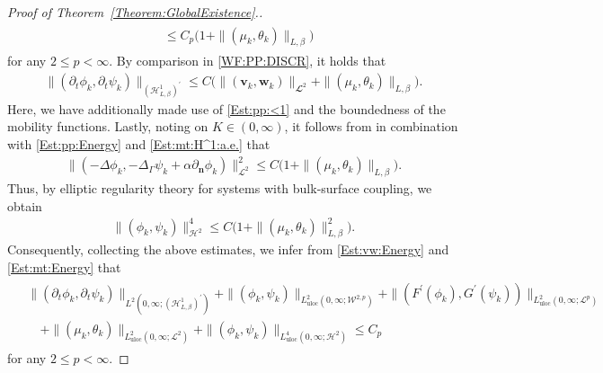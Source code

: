 \documentclass[10pt,reqno]{amsart}
\theoremstyle{remark}
\numberwithin{equation}{section}
\newcommand{\norm}[1]{\| #1 \|}
\newcommand{\n}{\mathbf{n}}
\newcommand{\bv}{\mathbf{v}}
\newcommand{\bw}{\mathbf{w}}
\newcommand{\delt}{\partial_{t}}
\newcommand{\deln}{\partial_\n}
\newcommand{\Lap}{\Delta}
\newcommand{\Lapg}{\Delta_\Ga}
\newcommand{\Ga}{\Gamma}
\begin{document}
\begin{proof}[Proof of Theorem~\ref{Theorem:GlobalExistence}.]
\begin{align}
\begin{split}
        &\leq C_p\big(1 + \norm{(\mu_k,\theta_k)}_{L,\beta}\big)
    \end{split}
\end{align}
for any $2 \leq p < \infty$. By comparison in \eqref{WF:PP:DISCR}, it holds that
\begin{align}\label{Est:pp:delt:a.e.}
    \norm{(\delt\phi_k,\delt\psi_k)}_{(\mathcal{H}^1_{L,\beta})^\prime} \leq C\big(\norm{(\bv_k,\bw_k)}_{\mathbfcal{L}^2} + \norm{(\mu_k,\theta_k)}_{L,\beta}\big).
\end{align}
Here, we have additionally made use of \eqref{Est:pp:<1} and the boundedness of the mobility functions. Lastly, noting on $K\in(0,\infty)$, it follows from \cite[Corollary~5.4]{Giorgini2025} in combination with \eqref{Est:pp:Energy} and \eqref{Est:mt:H^1:a.e.} that
\begin{align*}
    \norm{(-\Lap\phi_k,-\Lapg\psi_k + \alpha\deln\phi_k)}_{\mathcal{L}^2}^2 \leq C\big(1 + \norm{(\mu_k,\theta_k)}_{L,\beta}\big).
\end{align*}
Thus, by elliptic regularity theory for systems with bulk-surface coupling, we obtain 
\begin{align}\label{Est:pp:H^2:4}
    \norm{(\phi_k,\psi_k)}_{\mathcal{H}^2}^4 \leq C\big(1 + \norm{(\mu_k,\theta_k)}_{L,\beta}^2\big).
\end{align}
Consequently, collecting the above estimates, we infer from \eqref{Est:vw:Energy} and \eqref{Est:mt:Energy} that
\begin{align}\label{Est:pp:all:Thm}
    \begin{split}
        &\norm{(\delt\phi_k,\delt\psi_k)}_{L^2(0,\infty;(\mathcal{H}^1_{L,\beta})^\prime)} + \norm{(\phi_k,\psi_k)}_{L^2_{\mathrm{uloc}}(0,\infty;\mathcal{W}^{2,p})} + \norm{(F^\prime(\phi_k),G^\prime(\psi_k))}_{L^2_{\mathrm{uloc}}(0,\infty;\mathcal{L}^p)} \\
        &\quad + \norm{(\mu_k,\theta_k)}_{L^2_{\mathrm{uloc}}(0,\infty;\mathcal{L}^2)} + \norm{(\phi_k,\psi_k)}_{L^4_{\mathrm{uloc}}(0,\infty;\mathcal{H}^2)} \leq C_p
    \end{split}
\end{align}
for any $2 \leq p < \infty$.


\end{proof}
\end{document}
